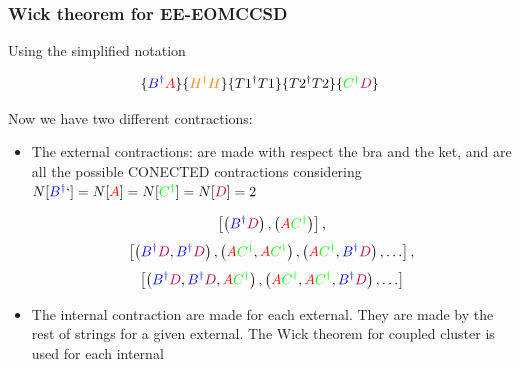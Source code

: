 \documentclass{beamer}
\begin{document}
\begin{frame}
\frametitle{Wick theorem for EE-EOMCCSD}

\begin{footnotesize}


Using the simplified notation

\[
\{
\textcolor{blue}{B^{\dagger}}
\textcolor{red}{A}
\}
\{
\textcolor{orange}{H^{\dagger}}\textcolor{orange}{H}
\}
\{
T1^{\dagger}
T1
\}
\{
T2^{\dagger}
T2
\}
\{
\textcolor{green}{C^{\dagger}}
\textcolor{purple}{D}
\}
\]

Now we have two different contractions:
\begin{itemize}
\item The external contractions: are made with respect the bra and the ket, and are all the possible CONECTED contractions considering $N[\textcolor{blue}{B^{\dagger}}`]=N[\textcolor{red}{A}]=N[\textcolor{green}{C^{\dagger}}]=N[\textcolor{purple}{D}]=2$


\[
\left[
\left(
\textcolor{blue}{B^{\dagger}}
\textcolor{purple}{D}
\right),
\left(
\textcolor{red}{A}
\textcolor{green}{C^{\dagger}}
\right)
\right],
\]
\[
\left[
\left(
\textcolor{blue}{B^{\dagger}}
\textcolor{purple}{D},
\textcolor{blue}{B^{\dagger}}
\textcolor{purple}{D}
\right),
\left(
\textcolor{red}{A}
\textcolor{green}{C^{\dagger}},
\textcolor{red}{A}
\textcolor{green}{C^{\dagger}}
\right)
,
\left(
\textcolor{red}{A}
\textcolor{green}{C^{\dagger}},
\textcolor{blue}{B^{\dagger}}
\textcolor{purple}{D}
\right), \ldots
\right],
\]
\[
\left[
\left(
\textcolor{blue}{B^{\dagger}}
\textcolor{purple}{D},
\textcolor{blue}{B^{\dagger}}
\textcolor{purple}{D},\textcolor{red}{A}
\textcolor{green}{C^{\dagger}}
\right),
\left(
\textcolor{red}{A}
\textcolor{green}{C^{\dagger}},
\textcolor{red}{A}
\textcolor{green}{C^{\dagger}},
\textcolor{blue}{B^{\dagger}}
\textcolor{purple}{D}
\right)
,\ldots
\right]
\]

\item The internal contraction are made for each external. They are made by the rest of strings for a given external. The Wick theorem for coupled cluster is used for each internal  

\end{itemize}
\end{footnotesize}
\end{frame}
\end{document}
